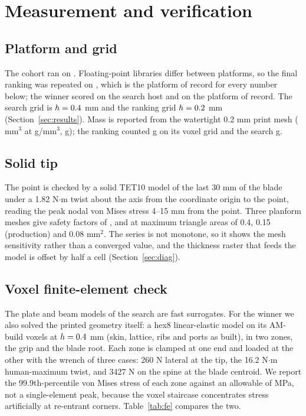\section{Measurement and verification}\label{sec:measure}
\subsection{Platform and grid}
The cohort ran on \gHost. Floating-point libraries differ between platforms, so the final ranking was repeated on
\gPlatform, which is the platform of record for every number below; the winner scored \gScoreArm{} on the search host
and \gScore{} on the platform of record. The search grid is $h = 0.4$ mm and the ranking grid $h = 0.2$ mm
(Section~\ref{sec:results}). Mass is reported from the watertight 0.2 mm print mesh (\gVolAM{} mm$^3$ at
\gDensity{} g/mm$^3$, \gMassG{} g); the ranking counted \gMassRankG{} g on its voxel grid and the search \gMassVoxelG{} g.

\subsection{Solid tip}
The point is checked by a solid TET10 model of the last 30 mm of the blade under a 1.82 N$\cdot$m twist about the axis from the
coordinate origin to the point, reading the peak nodal von Mises stress 4--15 mm from the point. Three planform meshes give
safety factors of \gTipConvA, \gTipConvB{} and \gTipConvC{} at maximum triangle areas of 0.4, 0.15
(production) and 0.08 mm$^2$. The series is not monotone, so it shows the mesh sensitivity rather than a converged value, and the thickness raster
that feeds the model is offset by half a cell (Section~\ref{sec:diag}).

\subsection{Voxel finite-element check}
The plate and beam models of the search are fast surrogates. For the winner we also solved the printed geometry
itself: a hex8 linear-elastic model on its AM-build voxels at $h = 0.4$ mm (skin, lattice, ribs and ports as built),
in two zones, the grip and the blade root. Each zone is clamped at one end and loaded at the other with the wrench of
three cases: 260 N lateral at the tip, the 16.2 N$\cdot$m human-maximum twist, and 3427 N on the spine at the blade
centroid. We report the 99.9th-percentile von Mises stress of each zone against an allowable of \gFeAllow{} MPa, not a
single-element peak, because the voxel staircase concentrates stress artificially at re-entrant corners.
Table~\ref{tab:fe} compares the two.

